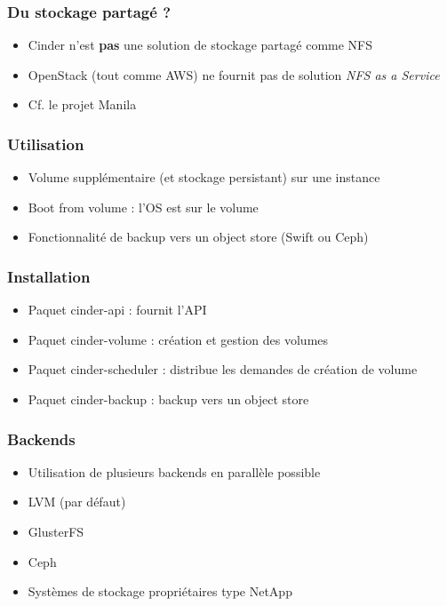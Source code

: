   \begin{frame}
    \frametitle{Du stockage partagé ?}
    \begin{itemize}
      \item Cinder n'est \textbf{pas} une solution de stockage partagé comme NFS
      \item OpenStack (tout comme AWS) ne fournit pas de solution \textit{NFS as a Service}
      \item Cf. le projet Manila
    \end{itemize}
  \end{frame}

  \begin{frame}
    \frametitle{Utilisation}
    \begin{itemize}
      \item Volume supplémentaire (et stockage persistant) sur une instance
      \item Boot from volume : l'OS est sur le volume
      \item Fonctionnalité de backup vers un object store (Swift ou Ceph)
    \end{itemize}
  \end{frame}

  \begin{frame}
    \frametitle{Installation}
    \begin{itemize}
      \item Paquet cinder-api : fournit l'API
      \item Paquet cinder-volume : création et gestion des volumes
      \item Paquet cinder-scheduler : distribue les demandes de création de volume
      \item Paquet cinder-backup : backup vers un object store
    \end{itemize}
  \end{frame}

  \begin{frame}
    \frametitle{Backends}
    \begin{itemize}
      \item Utilisation de plusieurs backends en parallèle possible
      \item LVM (par défaut)
      \item GlusterFS
      \item Ceph
      \item Systèmes de stockage propriétaires type NetApp
    \end{itemize}
  \end{frame}

